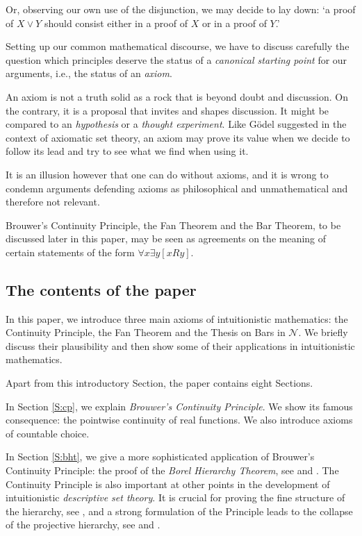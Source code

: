 \documentclass[a4paper]{amsart}
\theoremstyle{plain}
\begin{document}
Or, observing our own use of the disjunction, we may decide to lay down: `a proof of $X \vee Y$ should consist either in a proof of $X$ or in a proof of $Y$.' 



Setting up our common mathematical discourse, we have to discuss carefully the question   which principles  deserve the status of a {\it canonical starting point} for our arguments, i.e., the status of an \textit{axiom}.



An axiom  is not a truth solid as a rock that is beyond doubt and discussion. On the contrary, it is a proposal that invites and shapes discussion. It might be compared to an {\it hypothesis} or a {\it thought experiment}. Like G\"odel suggested in the context of axiomatic  set theory, an axiom may prove its value when we decide to follow its lead and try to see what we find when using it. 

It is an illusion however that one can do without axioms, and it is wrong to condemn arguments defending  axioms as philosophical and unmathematical and therefore not relevant.

Brouwer's Continuity Principle, the Fan Theorem and the Bar Theorem, to be discussed later in this paper, may be seen as  agreements on the meaning of certain statements of the form $\forall x \exists y[xRy]$.


\subsection{The contents of the paper} In this paper, we  introduce three main axioms of intuitionistic mathematics: the Continuity Principle, the Fan Theorem and the Thesis on Bars in $\mathcal{N}$.  We briefly discuss their plausibility and then show some of their applications in intuitionistic mathematics.

Apart from this introductory Section, the paper contains eight Sections.

 


 
In Section \ref{S:cp}, we explain {\it Brouwer's Continuity Principle}. We show its famous consequence: the pointwise continuity of real functions. We also introduce axioms of countable choice.

In Section \ref{S:bht}, we give a more sophisticated application of Brouwer's Continuity Principle: the proof of the {\it Borel Hierarchy Theorem},  see \cite[Chapter 9]{veldman1981} and \cite[Section 7]{veldman2008a}.   The Continuity Principle is also important at other points in the development of  intuitionistic {\it descriptive set theory}.   It is crucial for proving the fine structure of the hierarchy, see \cite{veldman2009b},  and a strong formulation of the  Principle leads to the collapse of the projective hierarchy, see \cite[Chapter 14]{veldman1981} and \cite[Section 7]{veldman2019}.
\end{document}
